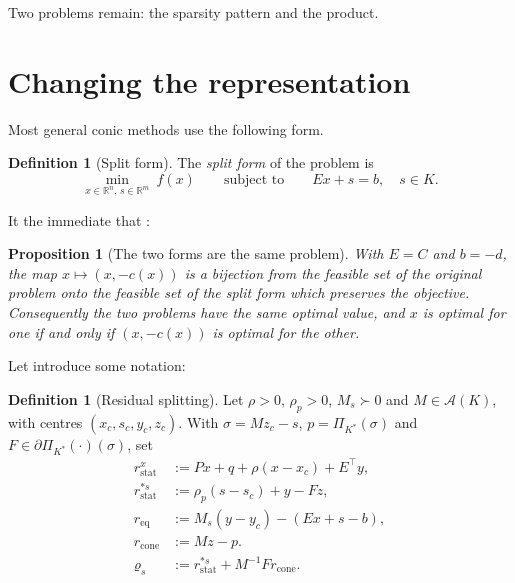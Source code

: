 \documentclass[a4paper,11pt]{book}
\theoremstyle{plain}
\newtheorem{proposition}[theorem]{Proposition}
\theoremstyle{definition}
\newtheorem{definition}[theorem]{Definition}
\theoremstyle{remark}
\numberwithin{equation}{chapter}
\numberwithin{algorithm}{chapter}
\newcommand{\R}{\mathbb{R}}
\newcommand{\proj}[2]{\Pi_{#2}\!\left(#1\right)}
\begin{document}
	Two problems remain: the sparsity pattern and the product.
	
	\section{Changing the representation}
	
	Most general conic methods use the following form.
	\begin{definition}[Split form]
		The \emph{split form} of the problem is
		\begin{equation}
			\min_{x\in\R^n,\,s\in\R^m}\ f(x)
			\qquad\text{subject to}\qquad
			Ex+s=b,\quad s\in K .
		\end{equation}
	\end{definition}
	
	It the immediate that :
	\begin{proposition}[The two forms are the same problem]
		With $E=C$ and $b=-d$, the map $x\mapsto(x,-c(x))$ is a bijection from the
		feasible set of the original problem onto the feasible set of the split form
		which preserves the objective. Consequently the two problems have the same
		optimal value, and $x$ is optimal for one if and only if $(x,-c(x))$ is optimal
		for the other.
	\end{proposition}
	
	
	Let introduce some notation:
	\begin{definition}[Residual splitting]
		Let $\rho>0$, $\rho_p>0$, $M_s\succ0$ and $M\in\mathcal{A}(K)$, with centres
		$(x_c,s_c,y_c,z_c)$. With $\sigma=Mz_c-s$, $p=\proj{\sigma}{K^*}$ and
		$F\in\partial\proj{\cdot}{K^*}(\sigma)$, set
		\begin{align}
			r_{\mathrm{stat}}^x
			&:= Px+q+\rho(x-x_c)+E^\top y, \\
			r_{\mathrm{stat}}^{*s}
			&:= \rho_p(s-s_c)+y-Fz, \\
			r_{\mathrm{eq}}
			&:= M_s(y-y_c)-(Ex+s-b), \\
			r_{\mathrm{cone}}
			&:= Mz-p.\\	
			\varrho_s
			&:= r_{\mathrm{stat}}^{*s}+M^{-1}Fr_{\mathrm{cone}}.
		\end{align}
		
	\end{definition}
	
\end{document}
